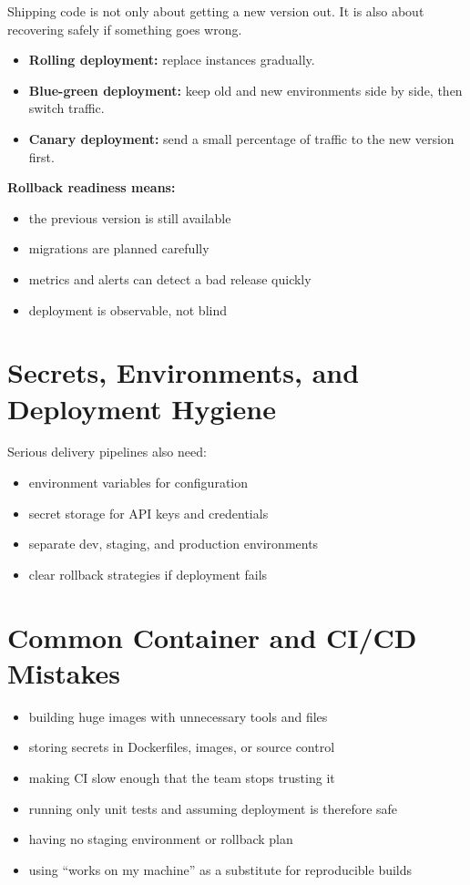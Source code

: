 \documentclass[12pt, a4paper, oneside]{book}
\begin{document}
Shipping code is not only about getting a new version out. It is also about recovering safely if something goes wrong.

\begin{itemize}[leftmargin=2em]
    \item \textbf{Rolling deployment:} replace instances gradually.
    \item \textbf{Blue-green deployment:} keep old and new environments side by side, then switch traffic.
    \item \textbf{Canary deployment:} send a small percentage of traffic to the new version first.
\end{itemize}

\textbf{Rollback readiness means:}
\begin{itemize}[leftmargin=2em]
    \item the previous version is still available
    \item migrations are planned carefully
    \item metrics and alerts can detect a bad release quickly
    \item deployment is observable, not blind
\end{itemize}

\section{Secrets, Environments, and Deployment Hygiene}

Serious delivery pipelines also need:
\begin{itemize}[leftmargin=2em]
    \item environment variables for configuration
    \item secret storage for API keys and credentials
    \item separate dev, staging, and production environments
    \item clear rollback strategies if deployment fails
\end{itemize}

\section{Common Container and CI/CD Mistakes}

\begin{itemize}[leftmargin=2em]
    \item building huge images with unnecessary tools and files
    \item storing secrets in Dockerfiles, images, or source control
    \item making CI slow enough that the team stops trusting it
    \item running only unit tests and assuming deployment is therefore safe
    \item having no staging environment or rollback plan
    \item using ``works on my machine'' as a substitute for reproducible builds
\end{itemize}
\end{document}
